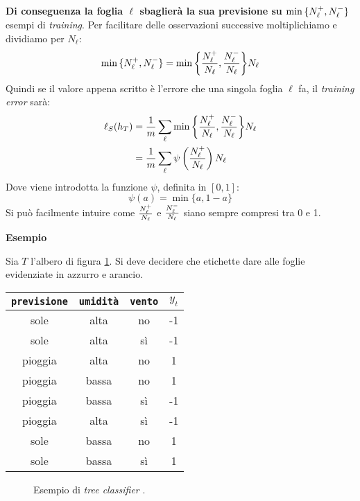 \textbf{Di conseguenza la foglia $\ell$ sbaglierà la sua previsione su
$\min{\{\ensuremath{N_{\ell}^+},\ensuremath{N_{\ell}^-}\}}$} esempi di \textit{training}. Per facilitare delle osservazioni
successive moltiplichiamo e dividiamo per $N_{\ell}$:
$$ \min{\{\ensuremath{N_{\ell}^+},\ensuremath{N_{\ell}^-}\}} = 
\min{\left\{\frac{\ensuremath{N_{\ell}^+}}{N_{\ell}},\frac{\ensuremath{N_{\ell}^-}}{N_{\ell}}\right\}}N_{\ell} $$
Quindi se il valore appena scritto è l'errore che una singola foglia $\ell$ fa, il
\textit{training error} sarà:
$$ 
\begin{aligned}
\ell_{S}(h_T)
&=\frac{1}{m}\sum_{\ell}\min{\left\{\frac{\ensuremath{N_{\ell}^+}}{N_{\ell}},\frac{\ensuremath{N_{\ell}^-}}{N_{\ell}}\right\}}N_{\ell}\\
&=\frac{1}{m}\sum_{\ell} \psi \left(\frac{N_{\ell}^+}{N_{\ell}}\right)N_{\ell}\\
\end{aligned}
$$
Dove viene introdotta la funzione $\psi$, definita in $[0,1]$:
$$\psi(a) = \min{\{a,1-a\}}$$
Si può facilmente intuire come $\frac{N_{\ell}^+}{N_{\ell}}$ e $\frac{N_{\ell}^-}{N_{\ell}}$ siano
sempre compresi tra 0 e 1.

\textbf{Esempio}

Sia $T$ l'albero di figura \ref{fig:tree_class_ex1}. Si deve decidere che etichette dare
alle foglie evidenziate in azzurro e arancio.

\begin{center}
    \begin{tabular}{|c|c|c|c|} \hline
        \texttt{previsione} & \texttt{umidità} & \texttt{vento} & $y_t$ \\ \hline
        sole & alta & no & -1\\
        sole & alta & sì & -1\\
        pioggia & alta & no & 1\\
        pioggia & bassa & no & 1\\
        pioggia & bassa & sì & -1\\
        pioggia & alta & sì & -1\\
        sole & bassa & no & 1\\
        sole & bassa & sì & 1\\ \hline
    \end{tabular}
\end{center}

\begin{figure}[h]
    \centering
    
    \caption{Esempio di \textit{tree classifier} .
    \label{fig:tree_class_ex1}}
\end{figure}